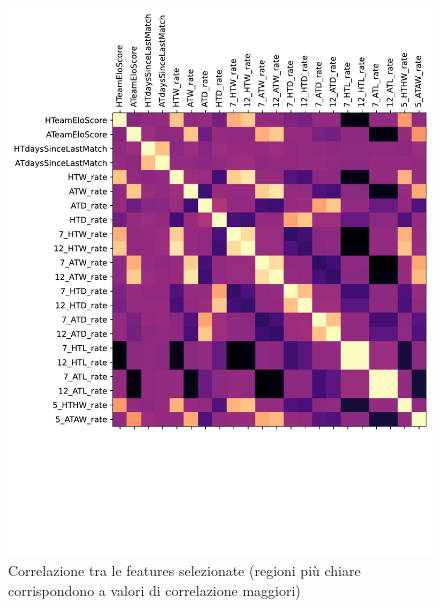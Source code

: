 \begin{figure}[h]
    \centering
    \includegraphics[scale=0.4]{tesina/img/corr_sel_feat.pdf}
    \caption{Correlazione tra le features selezionate (regioni più chiare corrispondono a valori di correlazione maggiori)}
    \label{fig:lstmColFeatures}
\end{figure}